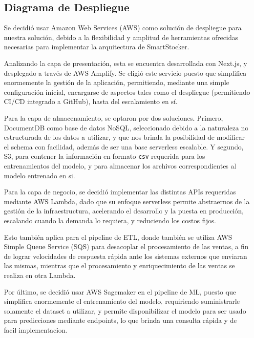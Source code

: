 \subsection{Diagrama de Despliegue}\label{sec:arquitectura-despliegue}
Se decidió usar Amazon Web Services (AWS) como solución de despliegue para nuestra solución, debido a la flexibilidad y amplitud de herramientas ofrecidas necesarias para implementar la arquitectura de SmartStocker.

Analizando la capa de presentación, esta se encuentra desarrollada con Next.js, y desplegado a través de AWS Amplify. Se eligió este servicio puesto que simplifica enormemente la gestión de la aplicación, permitiendo, mediante una simple configuración inicial, encargarse de aspectos tales como el despliegue (permitiendo CI/CD integrado a GitHub), hasta del escalamiento en sí.

Para la capa de almacenamiento, se optaron por dos soluciones. Primero, DocumentDB como base de datos NoSQL, seleccionado debido a la naturaleza no estructurada de los datos a utilizar, y que nos brinda la posibilidad de modificar el schema con facilidad, además de ser una base serverless escalable. Y segundo, S3, para contener la información en formato \verb|csv| requerida para los entrenamientos del modelo, y para almacenar los archivos correspondientes al modelo entrenado en si.

Para la capa de negocio, se decidió implementar las distintas APIs requeridas mediante AWS Lambda, dado que su enfoque serverless permite abstraernos de la gestión de la infraestructura, acelerando el desarrollo y la puesta en producción, escalando cuando la demanda lo requiera, y reduciendo los costos fijos.

Esto también aplica para el pipeline de ETL, donde también se utiliza AWS Simple Queue Service (SQS) para desacoplar el procesamiento de las ventas, a fin de lograr velocidades de respuesta rápida ante los sistemas externos que enviaran las mismas, mientras que el procesamiento y enriquecimiento de las ventas se realiza en otra Lambda.

Por último, se decidió usar AWS Sagemaker en el pipeline de ML, puesto que simplifica enormemente el entrenamiento del modelo, requiriendo suministrarle solamente el dataset a utilizar, y permite disponibilizar el modelo para ser usado para predicciones mediante endpoints, lo que brinda una consulta rápida y de facil implementacion.

